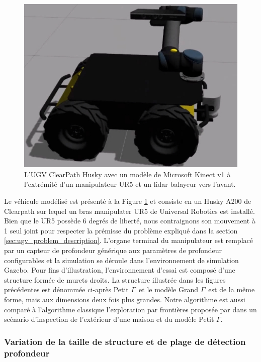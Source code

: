 \begin{figure}[h]
  \centering
  \includegraphics[width=0.5\linewidth]{images/ugv_gazebo_husky.jpg}
  \caption[L'UGV utilisé lors des simulations]{L'UGV ClearPath Husky avec un modèle de Microsoft Kinect v1 à l'extrémité d'un manipulateur UR5 et un lidar balayeur vers l'avant.}
  \label{fig:ugv_gazebo_husky}
\end{figure}

Le véhicule modélisé est présenté à la Figure \ref{fig:ugv_gazebo_husky} et consiste en un Husky A200 de Clearpath sur lequel un bras manipulater UR5 de Universal Robotics est installé. Bien que le UR5 possède 6 degrés de liberté, nous contraignons son mouvement à 1 seul joint pour respecter la prémisse du problème expliqué dans la section \ref{sec:ugv_problem_description}. L'organe terminal du manipulateur est remplacé par un capteur de profondeur générique aux paramètres de profondeur configurables et la simulation se déroule dans l'environnement de simulation Gazebo. Pour fins d'illustration, l'environnement d'essai est composé d'une structure formée de murets droits. La structure illustrée dans les figures précédentes est dénommée ci-après \guillemotleft Petit $\Gamma$\guillemotright\ et le modèle \guillemotleft Grand $\Gamma$\guillemotright\ est de la même forme, mais aux dimensions deux fois plus grandes. Notre algorithme est aussi comparé à l'algorithme classique l'exploration par frontières proposée par \citep{Yamauchi1997} dans un scénario d'inspection de l'extérieur d'une maison et du modèle Petit $\Gamma$.

\subsubsection{Variation de la taille de structure et de plage de détection profondeur}

